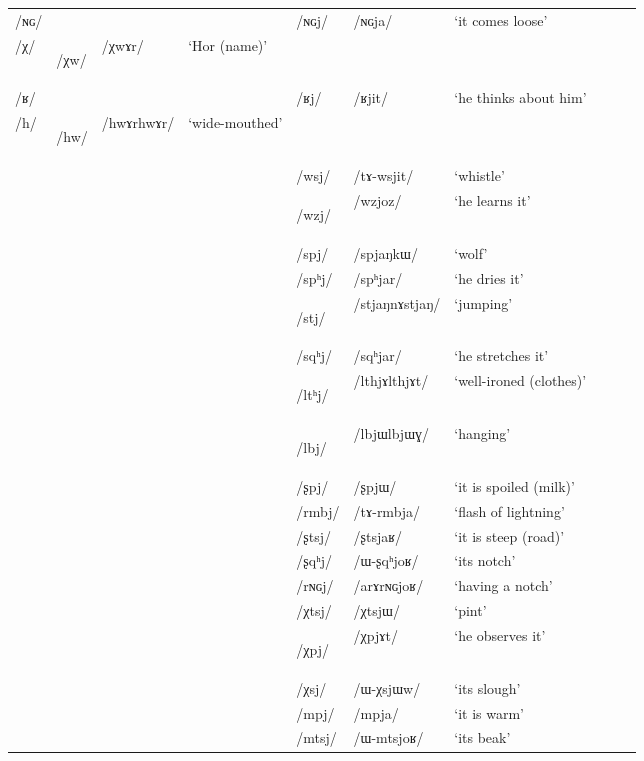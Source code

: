 \documentclass[12pt]{article}
\newcommand{\ipa}[1]{\mbox{\phon/#1/}}
\newcommand{\deux}[1]{\ipa{#1}\addtocounter{2clusters}{1}}
\newcommand{\trois}[1]{\ipa{#1}\addtocounter{3clusters}{1}}
\newcommand{\tib}[1]{\cellcolor{lightgray}\textbf{#1}}
\newcommand{\idph}[1]{\cellcolor{gray}\textbf{#1}}
\newcommand{\resetcounters}[2]{
\newcounter{#1}
\newcounter{#2}
 \setcounter{#1}{\value{2clusters}}
  \setcounter{#2}{\value{3clusters}}
 \setcounter{2clusters}{0}
  \setcounter{3clusters}{0}
}
\begin{document}
\begin{landscape}
\begin{longtable}{llllllllll}
\ipa{ɴɢ} & & & &\deux{ɴɢj} &\ipa{ɴɢja} & `it comes loose' \\ 
\ipa{χ} &\deux{χw} \tib{} &\ipa{χwɤr} & `Hor (name)' & & &\\ 
\ipa{ʁ} & & & &\deux{ʁj} &\ipa{ʁjit} & `he thinks about him' \\
\ipa{h} &\deux{hw} \idph{} &\ipa{hwɤrhwɤr} & `wide-mouthed' & & &\\ 
\midrule
 & & & &\trois{wsj} &\ipa{tɤ-wsjit} & `whistle' \\
 & & & &\trois{wzj}  \tib{} &\ipa{wzjoz} & `he learns it' \\            
 & & & &\trois{spj} &\ipa{spjaŋkɯ} & `wolf' \\
 & & & &\trois{spʰj} &\ipa{spʰjar} & `he dries it' \\
 & & & &\trois{stj}  \idph{} &\ipa{stjaŋnɤstjaŋ} & `jumping' \\
 & & & &\trois{sqʰj} &\ipa{sqʰjar} & `he stretches it' \\
 & & & &\trois{ltʰj}  \idph{} &\ipa{lthjɤlthjɤt} & `well-ironed (clothes)' \\
 & & & &\trois{lbj} \idph{} &\ipa{lbjɯlbjɯɣ} & `hanging' \\  
 & & & &\trois{ʂpj} &\ipa{ʂpjɯ} & `it is spoiled (milk)' \\
 & & & &\trois{rmbj} &\ipa{tɤ-rmbja} & `flash of lightning' \\
 & & & &\trois{ʂtsj} &\ipa{ʂtsjaʁ} & `it is steep (road)' \\
 & & & &\trois{ʂqʰj} &\ipa{ɯ-ʂqʰjoʁ} & `its notch' \\
 & & & &\trois{rɴɢj} &\ipa{arɤrɴɢjoʁ} & `having a notch' \\
 & & & &\trois{χtsj} &\ipa{χtsjɯ} & `pint' \\
 & & & &\trois{χpj} \tib{} &\ipa{χpjɤt} & `he  observes it' \\
 & & & &\trois{χsj} &\ipa{ɯ-χsjɯw} & `its slough' \\
 & & & &\trois{mpj} &\ipa{mpja} & `it is warm' \\
 & & & &\trois{mtsj} &\ipa{ɯ-mtsjoʁ} & `its beak' \\
\bottomrule
\end{longtable}
\end{landscape}
  \resetcounters{2Cjw}{3Cjw} %
\end{document}
